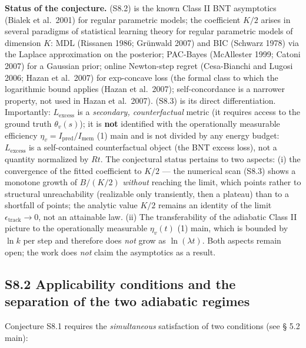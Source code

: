 \documentclass[pdflatex,sn-mathphys-ay]{sn-jnl}
\begin{document}
\textbf{Status of the conjecture.} (S8.2) is the known Class II BNT asymptotics (Bialek et al.~2001) for regular parametric models; the coefficient \(K/2\) arises in several paradigms of statistical learning theory for regular parametric models of dimension \(K\): MDL (Rissanen 1986; Grünwald 2007) and BIC (Schwarz 1978) via the Laplace approximation on the posterior; PAC-Bayes (McAllester 1999; Catoni 2007) for a Gaussian prior; online Newton-step regret (Cesa-Bianchi and Lugosi 2006; Hazan et al.~2007) for exp-concave loss (the formal class to which the logarithmic bound applies (Hazan et al.~2007); self-concordance is a narrower property, not used in Hazan et al.~2007). (S8.3) is its direct differentiation. Importantly: \(L_{\text{excess}}\) is a \emph{secondary, counterfactual} metric (it requires access to the ground truth \(\theta_v(s)\)); it is \textbf{not} identified with the operationally measurable efficiency \(\eta_v = I_{\text{pred}}/I_{\text{mem}}\) (1) main and is not divided by any energy budget: \(L_{\text{excess}}\) is a self-contained counterfactual object (the BNT excess loss), not a quantity normalized by \(Rt\). The conjectural status pertains to two aspects: (i) the convergence of the fitted coefficient to \(K/2\) --- the numerical scan (S8.3) shows a monotone growth of \(B/(K/2)\) \emph{without} reaching the limit, which points rather to structural unreachability (realizable only transiently, then a plateau) than to a shortfall of points; the analytic value \(K/2\) remains an identity of the limit \(\epsilon_{\text{track}} \to 0\), not an attainable law. (ii) The transferability of the adiabatic Class II picture to the operationally measurable \(\eta_v(t)\) (1) main, which is bounded by \(\ln k\) per step and therefore does \emph{not} grow as \(\ln(\lambda t)\). Both aspects remain open; the work does \emph{not} claim the asymptotics as a result.



\subsection*{S8.2 Applicability conditions and the separation of the two adiabatic regimes}\label{s8.2-applicability-conditions-and-the-separation-of-the-two-adiabatic-regimes}



Conjecture S8.1 requires the \emph{simultaneous} satisfaction of two conditions (see § 5.2 main):
\end{document}
